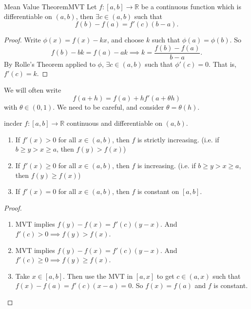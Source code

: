 \leavevmode
\begin{theorem}{Mean Value Theorem}{MVT}
    Let \(f: [a,b] \to \mathbb{R}\) be a continuous function which is differentiable on \((a,b)\), then \(\exists c \in (a,b)\) such that
    \[
        f(b) - f(a) = f'(c)(b-a).
    \]
\end{theorem}
\begin{proof}
    Write \(\phi(x) = f(x) - kx\), and choose \(k\) such that \(\phi(a) = \phi(b)\). So
    \[
        f(b) - bk = f(a) - ak \implies k = \frac{f(b) - f(a)}{b-a}.
    \]
    By Rolle's Theorem applied to \(\phi\), \(\exists c \in (a,b)\) such that \(\phi'(c) = 0\). That is, \(f'(c) = k\).
\end{proof}
\begin{remark}
    We will often write
    \[
        f(a + h) = f(a) + hf'(a + \theta h)
    \]
    with \(\theta \in (0,1)\). We need to be careful, and consider \(\theta = \theta(h)\).
\end{remark}
\begin{corollary}{}{incder}
    \(f: [a,b] \to \mathbb{R}\) continuous and differentiable on \((a,b)\).
    \begin{enumerate}
        \item If \(f'(x) > 0\) for all \(x \in (a,b)\), then \(f\) is strictly increasing. (i.e. if \(b \geq y > x \geq a\), then \(f(y) > f(x)\))
        \item If \(f'(x) \geq 0\) for all \(x \in (a,b)\), then \(f\) is increasing. (i.e. if \(b \geq y > x \geq a\), then \(f(y) \geq f(x)\))
        \item If \(f'(x) = 0\) for all \(x \in (a,b)\), then \(f\) is constant on \([a,b]\).
    \end{enumerate}
\end{corollary}
\begin{proof}
    \leavevmode
    \begin{enumerate}
        \item MVT implies \(f(y) - f(x) = f'(c)(y-x)\). And \(f'(c) > 0 \implies f(y) > f(x)\).
        \item MVT implies \(f(y) - f(x) = f'(c)(y-x)\). And \(f'(c) \geq  0 \implies f(y) \geq f(x)\).
        \item Take \(x \in [a,b]\). Then use the MVT in \([a,x]\) to get \(c \in (a,x)\) such that \(f(x) - f(a) = f'(c) (x-a) = 0\). So \(f(x) = f(a)\) and \(f\) is constant.
    \end{enumerate}
\end{proof}
